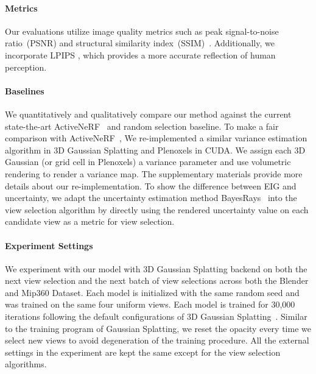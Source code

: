 \paragraph{Metrics} Our evaluations utilize image quality metrics such as peak signal-to-noise ratio~(PSNR) and structural similarity index~(SSIM)~\cite{wang2003multiscale}. Additionally, we incorporate LPIPS \cite{zhang2018unreasonable}, which provides a more accurate reflection of human perception.
\paragraph{Baselines} 
We quantitatively and qualitatively compare our method against the current state-the-art ActiveNeRF~\cite{pan2022activenerf} and random selection baseline.
To make a fair comparison with  ActiveNeRF~\cite{pan2022activenerf},
We re-implemented a similar variance estimation algorithm in 3D Gaussian Splatting and Plenoxels in CUDA. We assign each 3D Gaussian (or grid cell in Plenoxels) a variance parameter and use volumetric rendering to render a variance map. The supplementary materials provide more details about our re-implementation. 
To show the difference between EIG and uncertainty, we adapt the uncertainty estimation method BayesRays~\cite{goli2023} into the view selection algorithm by directly using the rendered uncertainty value on each candidate view as a metric for view selection. 


\paragraph{Experiment Settings} We experiment with our model with 3D Gaussian Splatting backend on both the next view selection and the next batch of view selections across both the Blender and Mip360 Dataset. Each model is initialized with the same random seed and was trained on the same four uniform views. Each model is trained for 30,000 iterations following the default configurations of 3D Gaussian Splatting~\cite{kerbl3Dgaussians}. Similar to the training program of Gaussian Splatting, we reset the opacity every time we select new views to avoid degeneration of the training procedure. 
All the external settings in the experiment are kept the same except for the view selection algorithms.

